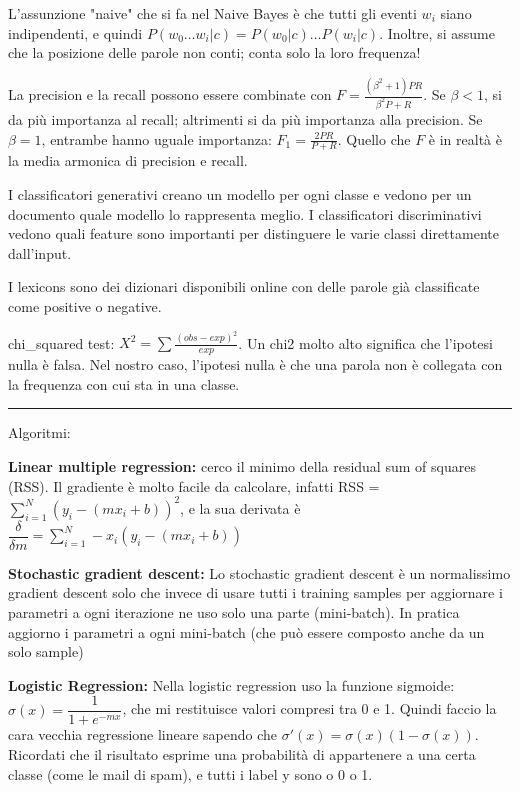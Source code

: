 \documentclass[a4paper,10pt]{article} %
\renewcommand{\b}[1]{%
    {\textbf{#1}}}
\begin{document}
\begin{multicols}{2}
L'assunzione "naive" che si fa nel Naive Bayes è che tutti gli eventi $w_i$ siano indipendenti, e quindi $P(w_0 \ldots w_i | c) = P(w_0|c) \ldots P(w_i|c)$. Inoltre, si assume che la posizione delle parole non conti; conta solo la loro frequenza!

La precision e la recall possono essere combinate con $F = \frac{(\beta ^2 + 1)PR}{\beta ^2 P + R}$. Se $\beta < 1$, si da più importanza al recall; altrimenti si da più importanza alla precision. Se $\beta = 1$, entrambe hanno uguale importanza: $F_1 = \frac{2PR}{P + R}$. Quello che $F$ è in realtà è la media armonica di precision e recall.

I classificatori generativi creano un modello per ogni classe e vedono per un documento quale modello lo rappresenta meglio. I classificatori discriminativi vedono quali feature sono importanti per distinguere le varie classi direttamente dall'input.

I lexicons sono dei dizionari disponibili online con delle parole già classificate come positive o negative.

chi\_squared test: $X^2 = \sum \frac{(obs - exp)^2}{exp}$. Un chi2 molto alto significa che l'ipotesi nulla è falsa. Nel nostro caso, l'ipotesi nulla è che una parola non è collegata con la frequenza con cui sta in una classe.

\end{multicols}
\bigbreak
\hrule
\medbreak
\centerline{Algoritmi:}
\begin{multicols}{2} 
\parindent=0pt

\b{Linear multiple regression:} cerco il minimo della residual sum of squares (RSS). Il gradiente è molto facile da calcolare, infatti RSS = $\sum\limits_{i=1}^N (y_i - (mx_i + b))^2$, e la sua derivata è $\dfrac{\delta}{\delta m} = \sum\limits_{i=1}^N -x_i(y_i - (mx_i + b))$

\b{Stochastic gradient descent:} Lo stochastic gradient descent è un normalissimo gradient descent solo che invece di usare tutti i training samples per aggiornare i parametri a ogni iterazione ne uso solo una parte (mini-batch). In pratica aggiorno i parametri a ogni mini-batch (che può essere composto anche da un solo sample)

\b{Logistic Regression:} Nella logistic regression uso la funzione sigmoide: $\sigma (x) = \dfrac{1}{1 + e^{-mx}}$, che mi restituisce valori compresi tra 0 e 1. Quindi faccio la cara vecchia regressione lineare sapendo che $\sigma ' (x) = \sigma (x) (1 - \sigma (x))$. Ricordati che il risultato esprime una probabilità di appartenere a una certa classe (come le mail di spam), e tutti i label y sono o 0 o 1.

\end{multicols}
\end{document}
